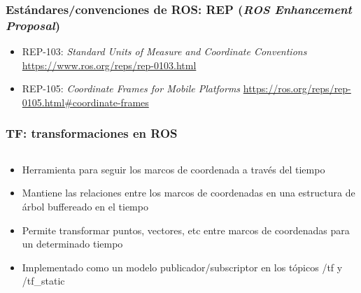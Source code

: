 \begin{frame}[fragile]
    \frametitle{Estándares/convenciones de ROS: REP (\emph{ROS Enhancement Proposal})}

    \begin{itemize}
        \item REP-103: \emph{Standard Units of Measure and Coordinate Conventions} \url{https://www.ros.org/reps/rep-0103.html}
        
        \item REP-105: \emph{Coordinate Frames for Mobile Platforms} \url{https://ros.org/reps/rep-0105.html#coordinate-frames}
    \end{itemize}
    
\end{frame}

\begin{frame}
	\frametitle{TF: transformaciones en ROS}
	
	\footnotesize
    
    
    \begin{columns}
		\begin{column}{0.5\textwidth}
			\begin{itemize}
			\item Herramienta para seguir los marcos de coordenada a través del tiempo
			\item Mantiene las relaciones entre los marcos de coordenadas en una estructura de árbol buffereado en el tiempo
			\item Permite transformar puntos, vectores, etc entre marcos de coordenadas para un determinado tiempo
			\item Implementado como un modelo publicador/subscriptor en los tópicos /tf y /tf\_static
			\end{itemize}
		

\end{column}
\end{columns}
\end{frame}

